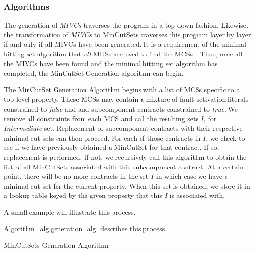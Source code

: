 \subsubsection{Algorithms}
The generation of \textit{MIVCs} traverses the program in a top down fashion. Likewise, the transformation of \textit{MIVCs} to MinCutSets traverses this program layer by layer if and only if all MIVCs have been generated. It is a requirement of the minimal hitting set algorithm that \textit{all} MUSs are used to find the MCSs~\cite{liffiton2016fast,gainer2017minimal,murakami2013efficient}. Thus, once all the MIVCs have been found and the minimal hitting set algorithm has completed, %
the MinCutSet Generation algorithm can begin. 

The MinCutSet Generation Algorithm begins with a list of MCSs specific to a top level property. These MCSs may contain a mixture of fault activation literals constrained to \textit{false} and %
and subcomponent contracts constrained to \textit{true}. We remove all constraints from each MCS and call the resulting sets $I$, for \textit{Intermediate} set. Replacement of subcomponent contracts with their respective minimal cut sets can then proceed. For each of those contracts in $I$, we check to see if we have previously obtained a MinCutSet for that contract. If so, replacement is performed. If not, we recursively call this algorithm to obtain the list of all MinCutSets associated with this subcomponent contract. At a certain point, there will be no more contracts in the set $I$ in which case we have a minimal cut set for the current property. When this set is obtained, we store it in a lookup table keyed by the given property that this $I$ is associated with. 

A small example will illustrate this process. 







Algorithm~\ref{alg:generation_alg} describes this process.


\begin{algorithm}[htbp]

	\caption{MinCutSets Generation Algorithm}
	\label{alg:generation_alg}
\end{algorithm}

